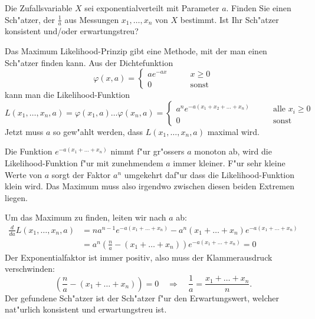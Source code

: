 Die Zufallsvariable $X$ sei exponentialverteilt mit Parameter $a$.
Finden Sie einen Sch"atzer, der $\frac1a$ aus Messungen $x_1,\dots,x_n$
von $X$ bestimmt. Ist Ihr Sch"atzer konsistent und/oder erwartungstreu?

\begin{loesung}
Das Maximum Likelihood-Prinzip gibt eine Methode, mit der man einen
Sch"atzer finden kann. Aus der Dichtefunktion
\[
\varphi(x,a)=\begin{cases}
ae^{-ax}&\qquad x \ge 0\\
0&\qquad\text{sonst}
\end{cases}
\]
kann man die Likelihood-Funktion
\[
L(x_1,\dots,x_n,a)=\varphi(x_1,a)\dots\varphi(x_n,a)=
\begin{cases}
a^ne^{-a(x_1+x_2+\dots+x_n)}&\qquad \text{alle $x_i \ge 0$}\\
0&\qquad\text{sonst}
\end{cases}
\]
Jetzt muss $a$ so gew"ahlt werden, dass $L(x_1,\dots,x_n,a)$
maximal wird.

Die Funktion $e^{-a(x_1+\dots+x_n)}$ nimmt f"ur gr"ossers $a$ monoton ab,
wird die Likelihood-Funktion f"ur mit zunehmendem $a$ immer kleiner. F"ur
sehr kleine Werte von $a$ sorgt der Faktor $a^n$ umgekehrt daf"ur dass
die Likelihood-Funktion klein wird. Das Maximum muss also irgendwo
zwischen diesen beiden Extremen liegen.

Um das Maximum zu finden, leiten wir nach $a$ ab:
\begin{align*}
\frac{d}{da}L(x_1,\dots,x_n,a)&=na^{n-1}e^{-a(x_1+\dots+x_n)}-a^n(x_1+\dots+x_n)e^{-a(x_1+\dots+x_n)}\\
&=a^n
\left(\frac{n}a-(x_1+\dots+x_n)\right)
e^{-a(x_1+\dots+x_n)}=0
\end{align*}
Der Exponentialfaktor ist immer positiv, also muss der Klammerausdruck
verschwinden:
\[
\left(\frac{n}a-(x_1+\dots+x_n)\right)=0
\quad\Rightarrow\quad
\frac1a=\frac{x_1+\dots+x_n}{n}.
\]
Der gefundene Sch"atzer ist der Sch"atzer f"ur den Erwartungswert,
welcher nat"urlich konsistent und erwartungstreu ist.
\end{loesung}

